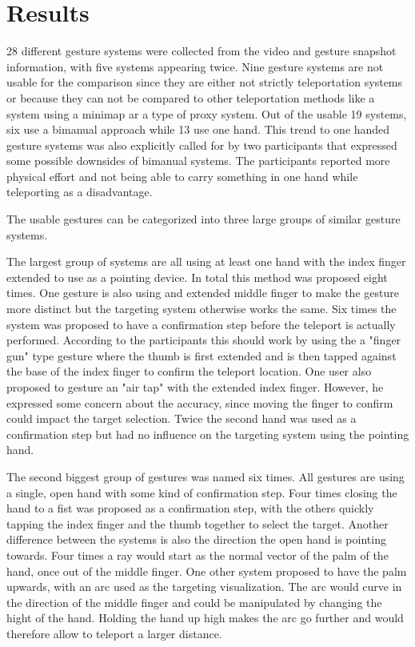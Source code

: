 \section{Results}
28 different gesture systems were collected from the video and gesture snapshot information, with five systems appearing twice. Nine gesture systems are not usable for the comparison since they are either not strictly teleportation systems or because they can not be compared to other teleportation methods like a system using a minimap ar a type of proxy system. Out of the usable 19 systems, six use a bimanual approach while 13 use one hand. This trend to one handed gesture systems was also explicitly called for by two participants that expressed some possible downsides of bimanual systems. The participants reported more physical effort and not being able to carry something in one hand while teleporting as a disadvantage.

The usable gestures can be categorized into three large groups of similar gesture systems. 

The largest group of systems are all using at least one hand with the index finger extended to use as a pointing device. In total this method was proposed eight times. One gesture is also using and extended middle finger to make the gesture more distinct but the targeting system otherwise works the same. Six times the system was proposed to have a confirmation step before the teleport is actually performed. According to the participants this should work by using the a "finger gun" type gesture where the thumb is first extended and is then tapped against the base of the index finger to confirm the teleport location. One user also proposed to gesture an "air tap" with the extended index finger. However, he expressed some concern about the accuracy, since moving the finger to confirm could impact the target selection. Twice the second hand was used as a confirmation step but had no influence on the targeting system using the pointing hand.

The second biggest group of gestures was named six times. All gestures are using a single, open hand with some kind of confirmation step. Four times closing the hand to a fist was proposed as a confirmation step, with the others quickly tapping the index finger and the thumb together to select the target. Another difference between the systems is also the direction the open hand is pointing towards. Four times a ray would start as the normal vector of the palm of the hand, once out of the middle finger. One other system proposed to have the palm upwards, with an arc used as the targeting visualization. The arc would curve in the direction of the middle finger and could be manipulated by changing the hight of the hand. Holding the hand up high makes the arc go further and would therefore allow to teleport a larger distance.

